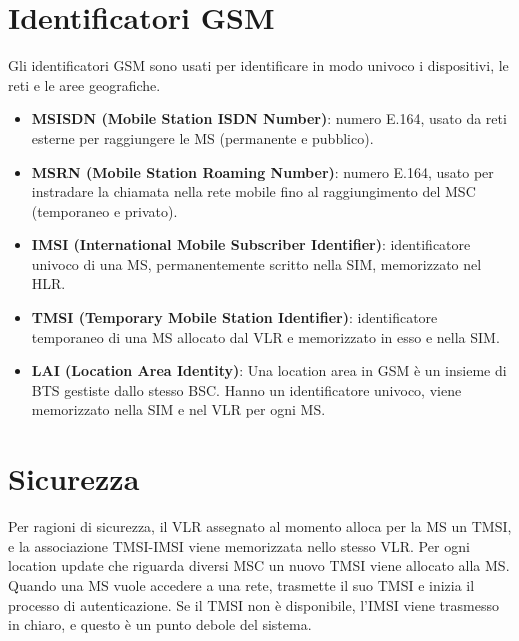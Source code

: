\section{Identificatori GSM}
Gli identificatori GSM sono usati per identificare in modo univoco i dispositivi, le reti e le aree geografiche.
\begin{itemize}
	\item \textbf{MSISDN (Mobile Station ISDN Number)}: numero E.164, usato da reti esterne per raggiungere le MS (permanente e pubblico).
	\item \textbf{MSRN (Mobile Station Roaming Number)}: numero E.164, usato per instradare la chiamata nella rete mobile fino al raggiungimento del MSC (temporaneo e privato).
	\item \textbf{IMSI (International Mobile Subscriber Identifier)}: identificatore univoco di una MS, permanentemente scritto nella SIM, memorizzato nel HLR.
	\item \textbf{TMSI (Temporary Mobile Station Identifier)}: identificatore temporaneo di una MS allocato dal VLR e memorizzato in esso e nella SIM.
	\item \textbf{LAI (Location Area Identity)}: Una location area in GSM è un insieme di BTS gestiste dallo stesso BSC. Hanno un identificatore univoco, viene memorizzato nella SIM e nel VLR per ogni MS.
\end{itemize}
\section{Sicurezza}
Per ragioni di sicurezza, il VLR assegnato al momento alloca per la MS un TMSI, e la associazione TMSI-IMSI viene memorizzata nello stesso VLR.
Per ogni location update che riguarda diversi MSC un nuovo TMSI viene allocato alla MS.
Quando una MS vuole accedere a una rete, trasmette il suo TMSI e inizia il processo di autenticazione.
Se il TMSI non è disponibile, l'IMSI viene trasmesso in chiaro, e questo è un punto debole del sistema.
